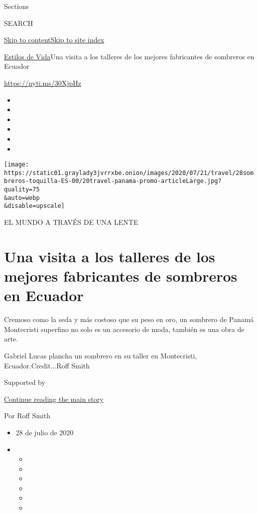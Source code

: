 Sections

SEARCH

\protect\hyperlink{site-content}{Skip to
content}\protect\hyperlink{site-index}{Skip to site index}

\href{/es/section/estilos-de-vida}{Estilos de Vida}\textbar{}Una visita
a los talleres de los mejores fabricantes de sombreros en Ecuador

\url{https://nyti.ms/30XjpHz}

\begin{itemize}
\item
\item
\item
\item
\item
\item
\end{itemize}

\texttt{[image: https://static01.graylady3jvrrxbe.onion/images/2020/07/21/travel/28sombreros-toquilla-ES-00/20travel-panama-promo-articleLarge.jpg?quality=75\\\&auto=webp\\\&disable=upscale]}

EL MUNDO A TRAVÉS DE UNA LENTE

\hypertarget{una-visita-a-los-talleres-de-los-mejores-fabricantes-de-sombreros-en-ecuador}{%
\section{Una visita a los talleres de los mejores fabricantes de
sombreros en
Ecuador}\label{una-visita-a-los-talleres-de-los-mejores-fabricantes-de-sombreros-en-ecuador}}

Cremoso como la seda y más costoso que su peso en oro, un sombrero de
Panamá Montecristi superfino no solo es un accesorio de moda, también es
una obra de arte.

Gabriel Lucas plancha un sombrero en su taller en Montecristi,
Ecuador.Credit...Roff Smith

Supported by

\protect\hyperlink{after-sponsor}{Continue reading the main story}

Por Roff Smith

\begin{itemize}
\item
  28 de julio de 2020
\item
  \begin{itemize}
  \item
  \item
  \item
  \item
  \item
  \item
  \end{itemize}
\end{itemize}

